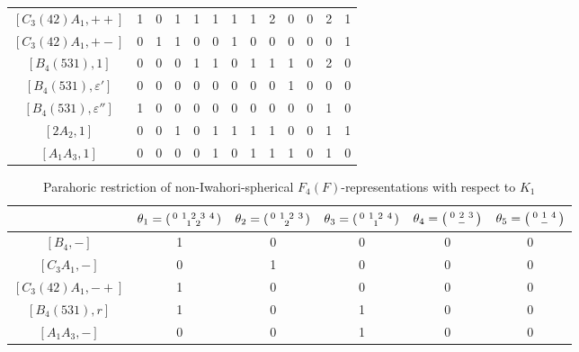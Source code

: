 \begin{landscape}
\begin{table}[ht]
{\begin{tabular}{|c|cccccccccccc|}
            $[C_3(42)A_1,++]$ & 1 & 0 & 1 & 1 & 1 & 1 & 1 & 2 & 0 & 0 & 2 & 1 \\
            $[C_3(42)A_1,+-]$ & 0 & 1 & 1 & 0 & 0 & 1 & 0 & 0 & 0 & 0 & 0 & 1 \\
            $[B_4(531),1]$ & 0 & 0 & 0 & 1 & 1 & 0 & 1 & 1 & 1 & 0 & 2 & 0 \\
            $[B_4(531),\varepsilon']$ & 0 & 0 & 0 & 0 & 0 & 0 & 0 & 0 & 1 & 0 & 0 & 0 \\
            $[B_4(531),\varepsilon'']$ & 1 & 0 & 0 & 0 & 0 & 0 & 0 & 0 & 0 & 0 & 1 & 0 \\
            $[2A_2,1]$ & 0 & 0 & 1 & 0 & 1 & 1 & 1 & 1 & 0 & 0 & 1 & 1 \\
            $[A_1A_3,1]$ & 0 & 0 & 0 & 0 & 1 & 0 & 1 & 1 & 1 & 0 & 1 & 0 \\\hline
        \end{tabular}
        }
    \end{table}

    \begin{table}[h!]
        \centering
        \caption{Parahoric restriction of non-Iwahori-spherical $F_4(F)$-representations with respect to $K_1$}\label{tbl:F4_K1_2}
        \begin{tabular}{|c|ccccc|}
            \hline
            & $\theta_1=\begin{psmallmatrix}
            0 \ 1\ 2\ 3\ 4\\
            \ \ \ 1\ 2 \ \ \
        \end{psmallmatrix}$ & $\theta_2=\begin{psmallmatrix}
            0 \ 1\ 2\ 3\\
            \ \ \ 2 \ \ \
        \end{psmallmatrix}$ & $\theta_3=\begin{psmallmatrix}
            0 \ 1\ 2\ 4\\
            \ \ \ 1 \ \ \
        \end{psmallmatrix}$ & $\theta_4=\begin{psmallmatrix}
            0 \ 2\ 3\\
            \ \ - \ \
        \end{psmallmatrix}$ & $\theta_5=\begin{psmallmatrix}
            0 \ 1\ 4\\
            \ \ - \ \
        \end{psmallmatrix}$ \\\hline
            $[B_4,-]$ & 1 & 0 & 0 & 0 & 0 \\\hline
            $[C_3A_1,-]$ & 0 & 1 & 0 & 0 & 0 \\\hline
            $[C_3(42)A_1,-+]$ & 1 & 0 & 0 & 0 & 0 \\
            $[B_4(531),r]$ & 1 & 0 & 1 & 0 & 0 \\
            $[A_1A_3,-]$ & 0 & 0 & 1 & 0 & 0 \\\hline            
        \end{tabular}
    \end{table}




\end{landscape}
